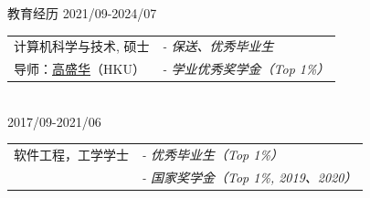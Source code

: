 \documentclass{resume} %
\begin{document}
\begin{rSection}{教育经历}
\hspace*{-1.5em}{\bf 上海科技大学} \hfill 2021/09-2024/07 \\
\begin{tabular}{@{}p{.3\linewidth}l}
计算机科学与技术, 硕士 \hfill & {\em - 保送、优秀毕业生}\\
导师：\href{https://scholar.google.com.sg/citations?user=fe-1v0MAAAAJ\&hl=en}{高盛华}（HKU） \hfill & {\em - 学业优秀奖学金（Top 1\%）}\\
\end{tabular} \\
\hspace*{-1.5em}{\bf 哈尔滨工业大学} \hfill 2017/09-2021/06 \\
\begin{tabular}{@{}p{.3\linewidth}l}
软件工程，工学学士 \hfill & {\em - 优秀毕业生（Top 1\%）}\\
 & {\em - 国家奖学金（Top 1\%, 2019、2020）}\\
\end{tabular}
\end{rSection}


\vspace{-6pt}
\end{document}
